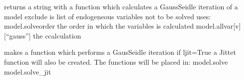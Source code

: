 \documentclass[letterpaper,10pt,english]{sphinxmanual}
\begin{document}
\begin{fulllineitems}

\begin{fulllineitems}
\label{\detokenize{index:modelclass.BaseModel.outsolve}}
\pysigstartsignatures
{}
\pysigstopsignatures
\sphinxAtStartPar
returns a string with a function which calculates a
Gauss\sphinxhyphen{}Seidle iteration of a model
exclude is list of endogeneous variables not to be solved
uses:
model.solveorder the order in which the variables is calculated
model.allvar{[}v{]}{[}“gauss”{]} the ccalculation

\end{fulllineitems}


\begin{fulllineitems}
\label{\detokenize{index:modelclass.BaseModel.make_solver}}
\pysigstartsignatures
{}
\pysigstopsignatures
\sphinxAtStartPar
makes a function which performs a Gaus\sphinxhyphen{}Seidle iteration
if ljit=True a Jittet function will also be created.
The functions will be placed in:
model.solve
model.solve\_jit

\end{fulllineitems}



\end{fulllineitems}
\end{document}

